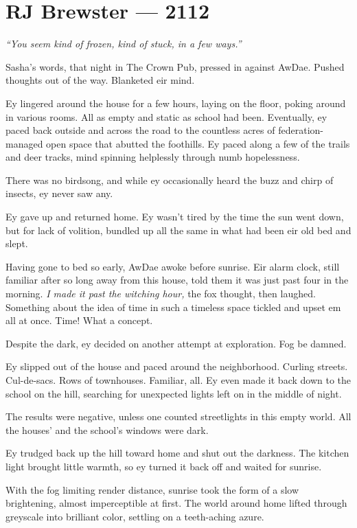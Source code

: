\hypertarget{rj-brewster-2112}{%
\chapter*{RJ Brewster — 2112}\label{rj-brewster-2112}}

\emph{``You seem kind of frozen, kind of stuck, in a few ways.''}

Sasha's words, that night in The Crown Pub, pressed in against AwDae. Pushed thoughts out of the way. Blanketed eir mind.

Ey lingered around the house for a few hours, laying on the floor, poking around in various rooms. All as empty and static as school had been. Eventually, ey paced back outside and across the road to the countless acres of federation-managed open space that abutted the foothills. Ey paced along a few of the trails and deer tracks, mind spinning helplessly through numb hopelessness.

There was no birdsong, and while ey occasionally heard the buzz and chirp of insects, ey never saw any.

Ey gave up and returned home. Ey wasn't tired by the time the sun went down, but for lack of volition, bundled up all the same in what had been eir old bed and slept.

Having gone to bed so early, AwDae awoke before sunrise. Eir alarm clock, still familiar after so long away from this house, told them it was just past four in the morning. \emph{I made it past the witching hour,} the fox thought, then laughed. Something about the idea of time in such a timeless space tickled and upset em all at once. Time! What a concept.

Despite the dark, ey decided on another attempt at exploration. Fog be damned.

Ey slipped out of the house and paced around the neighborhood. Curling streets. Cul-de-sacs. Rows of townhouses. Familiar, all. Ey even made it back down to the school on the hill, searching for unexpected lights left on in the middle of night.

The results were negative, unless one counted streetlights in this empty world. All the houses' and the school's windows were dark.

Ey trudged back up the hill toward home and shut out the darkness. The kitchen light brought little warmth, so ey turned it back off and waited for sunrise.

With the fog limiting render distance, sunrise took the form of a slow brightening, almost imperceptible at first. The world around home lifted through greyscale into brilliant color, settling on a teeth-aching azure.

